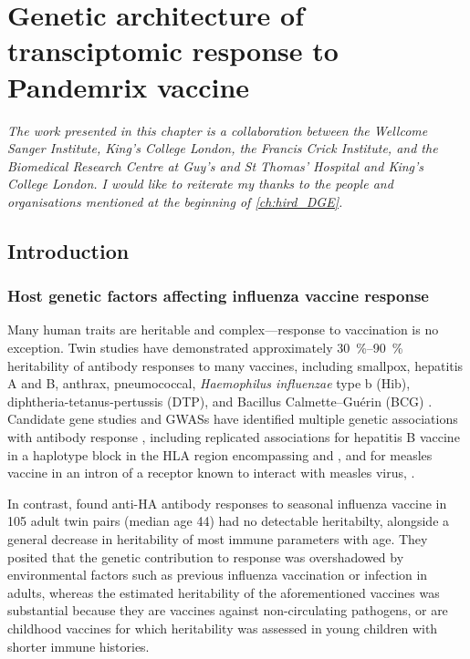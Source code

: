 %
%

\chapter{Genetic architecture of transciptomic response to Pandemrix vaccine}
\label{ch:hird_reQTL}

\textit{
    The work presented in this chapter is a collaboration between 
    the Wellcome Sanger Institute,
    King's College London, 
    the Francis Crick Institute,
    and the Biomedical Research Centre at Guy's and St Thomas' Hospital and King's College London.
    I would like to reiterate my thanks to the people and organisations mentioned at the beginning of \cref{ch:hird_DGE}.
}

\section{Introduction}

\subsection{Host genetic factors affecting influenza vaccine response}
\label{subsec:hird_reQTL_intro_geneticFactorsFluVaccine}

Many human traits are heritable and complex---response to vaccination is no exception.
Twin studies have demonstrated approximately \SIrange{30}{90}{\percent} heritability of antibody responses to many vaccines, including smallpox, hepatitis A and B, anthrax, pneumococcal, \textit{Haemophilus influenzae} type b (Hib), diphtheria-tetanus-pertussis (DTP), and Bacillus Calmette--Guérin (BCG) \autocite{mooney2013SystemsImmunogeneticsVaccines,oconnor2013CharacterizingVaccineResponses,newport2015GeneticRegulationInfant,brodin2015VariationHumanImmune}.
Candidate gene studies and \glspl{GWAS} have identified multiple genetic associations with antibody response \autocite{mooney2013SystemsImmunogeneticsVaccines,oconnor2013CharacterizingVaccineResponses,mentzer2015SearchingHumanGenetic,linnik2016ImpactHostGenetic}, 
including replicated associations 
for hepatitis B vaccine in a haplotype block in the \gls{HLA} region encompassing  and ,
and for measles vaccine in an intron of a receptor known to interact with measles virus, .

In contrast, \textcite{brodin2015VariationHumanImmune} found anti-\gls{HA} antibody responses to seasonal influenza vaccine in 105 adult twin pairs (median age \SI{44}{\year}) had no detectable heritabilty,
alongside a general decrease in heritability of most immune parameters with age.
They posited 
that the genetic contribution to response was overshadowed by environmental factors such as previous influenza vaccination or infection in adults, 
whereas the estimated heritability of the aforementioned vaccines was substantial
because they are vaccines against non-circulating pathogens, 
or are childhood vaccines for which heritability was assessed in young children with shorter immune histories.

